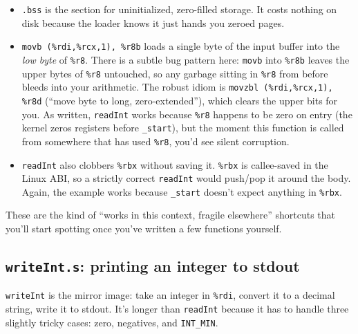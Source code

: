 \documentclass[11pt]{article}
\begin{document}
\begin{itemize}
  \item \texttt{.bss} is the section for uninitialized, zero-filled
    storage. It costs nothing on disk because the loader knows it
    just hands you zeroed pages.
  \item \texttt{movb (\%rdi,\%rcx,1), \%r8b} loads a single byte of
    the input buffer into the \emph{low byte} of \texttt{\%r8}. There
    is a subtle bug pattern here: \texttt{movb} into \texttt{\%r8b}
    leaves the upper bytes of \texttt{\%r8} untouched, so any garbage
    sitting in \texttt{\%r8} from before bleeds into your arithmetic.
    The robust idiom is \texttt{movzbl (\%rdi,\%rcx,1), \%r8d}
    (``move byte to long, zero-extended''), which clears the upper
    bits for you. As written, \texttt{readInt} works because
    \texttt{\%r8} happens to be zero on entry (the kernel zeros
    registers before \texttt{\_start}), but the moment this function
    is called from somewhere that has used \texttt{\%r8}, you'd see
    silent corruption.
  \item \texttt{readInt} also clobbers \texttt{\%rbx} without saving
    it. \texttt{\%rbx} is callee-saved in the Linux ABI, so a strictly
    correct \texttt{readInt} would push/pop it around the body. Again,
    the example works because \texttt{\_start} doesn't expect anything
    in \texttt{\%rbx}.
\end{itemize}

These are the kind of ``works in this context, fragile elsewhere''
shortcuts that you'll start spotting once you've written a few
functions yourself.

\subsection*{\texttt{writeInt.s}: printing an integer to stdout}

\texttt{writeInt} is the mirror image: take an integer in
\texttt{\%rdi}, convert it to a decimal string, write it to stdout.
It's longer than \texttt{readInt} because it has to handle three
slightly tricky cases: zero, negatives, and \texttt{INT\_MIN}.
\end{document}

